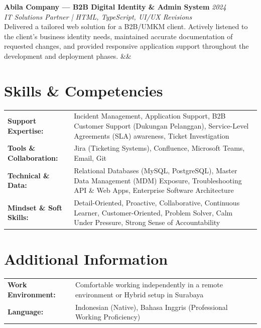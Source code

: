 \documentclass[a4paper,11pt]{article}
\newcommand{\cvproject}[5]{%
  \noindent\textbf{#1} \hfill \textit{#2} \\
  \textit{\small #3} \\
  {\small #4}
  \ifx&#5& \else \par\noindent{\small \href{#5}{View Repository / Demo}} \fi
  \vspace{6pt}
}
\begin{document}
\cvproject
  {Abila Company --- B2B Digital Identity \& Admin System}
  {2024}
  {IT Solutions Partner | HTML, TypeScript, UI/UX Revisions}
  {Delivered a tailored web solution for a B2B/UMKM client. Actively listened to the client's business identity needs, maintained accurate documentation of requested changes, and provided responsive application support throughout the development and deployment phases.}
  {}
\section{Skills \& Competencies}
\begin{tabularx}{\textwidth}{@{}l X@{}}
\textbf{Support Expertise:} & Incident Management, Application Support, B2B Customer Support (Dukungan Pelanggan), Service-Level Agreements (SLA) awareness, Ticket Investigation \\[3pt]
\textbf{Tools \& Collaboration:} & Jira (Ticketing Systems), Confluence, Microsoft Teams, Email, Git \\[3pt]
\textbf{Technical \& Data:} & Relational Databases (MySQL, PostgreSQL), Master Data Management (MDM) Exposure, Troubleshooting API \& Web Apps, Enterprise Software Architecture \\[3pt]
\textbf{Mindset \& Soft Skills:} & Detail-Oriented, Proactive, Collaborative, Continuous Learner, Customer-Oriented, Problem Solver, Calm Under Pressure, Strong Sense of Accountability \\
\end{tabularx}

\section{Additional Information}
\begin{tabularx}{\textwidth}{@{}l X@{}}
\textbf{Work Environment:} & Comfortable working independently in a remote environment or Hybrid setup in Surabaya \\[3pt]
\textbf{Language:} & Indonesian (Native), Bahasa Inggris (Professional Working Proficiency) \\
\end{tabularx}
\end{document}
